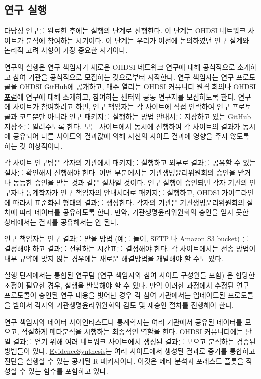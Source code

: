 \documentclass[11pt]{book}
\theoremstyle{definition}
\theoremstyle{definition}
\theoremstyle{definition}
\theoremstyle{remark}
\begin{document}
\subsection{연구 실행}\label{--1}

타당성 연구를 완료한 후에는 실행의 단계로 진행한다. 이 단계는 OHDSI
네트워크 사이트가 분석에 참여하는 시기이다. 이 단계는 우리가 이전에
논의하였던 연구 설계와 논리적 고려 사항이 가장 중요한 시기이다.

연구의 실행은 연구 책임자가 새로운 OHDSI 네트워크 연구에 대해 공식적으로
소개하고 참여 기관을 공식적으로 모집하는 것으로부터 시작한다. 연구
책임자는 연구 프로토콜을 OHDSI GitHub에 공개하고, 매주 열리는 OHDSI
커뮤니티 원격 회의나 \href{http://forums.ohdsi.org}{OHDSI 포럼}에 연구에
대해 소개하고, 참여하는 센터와 공동 연구자를 모집하도록 한다. 연구에
사이트가 참여하려고 하면, 연구 책임자는 각 사이트에 직접 연락하여 연구
프로토콜과 코드뿐만 아니라 연구 패키지를 실행하는 방법 안내서를 저장하고
있는 GitHub 저장소를 알려주도록 한다. 모든 사이트에서 동시에 진행하여 각
사이트의 결과가 동시에 공유되어 다른 사이트의 결과값에 의해 자신의
사이트 결과에 영향을 주지 않도록 하는 것 이상적이다.

각 사이트 연구팀은 각자의 기관에서 패키지를 실행하고 외부로 결과를
공유할 수 있는 절차를 확인해서 진행해야 한다. 어떤 부분에서는
기관생명윤리위원회의 승인을 받거나 동등한 승인을 받는 것과 같은 절차일
것이다. 연구 실행이 승인되면 각자 기관의 연구자나 통계학자가 연구
책임자의 안내서대로 패키지를 실행하고, OHDSI 가이드라인에 따라서
표준화된 형태의 결과를 생성한다. 각자의 기관은 기관생명윤리위원회의
절차에 따라 데이터를 공유하도록 한다. 만약, 기관생명윤리위원회의 승인을
얻지 못한 상태에서는 결과를 공유해서는 안 된다.

연구 책임자는 연구 결과를 받을 방법 (예를 들어, SFTP 나 Amazon S3
bucket) 를 결정해야 하고 결과를 전환하는 시간표를 결정해야 한다. 각
사이트에서는 전송 방법이 내부 규약에 맞지 않는 경우에는 새로운
해결방법을 개발해야 할 수도 있다.

실행 단계에서는 통합된 연구팀 (연구 책임자와 참여 사이트 구성원들 포함)
은 합당한 조정이 필요한 경우, 실행을 반복해야 할 수 있다. 만약 이러한
과정에서 수정된 연구 프로토콜이 승인된 연구 내용을 벗어난 경우 각 참여
기관에서는 업데이트된 프로토콜을 받아서 각자의 기관생명윤리위원회의 검토
및 재승인 절차를 진행해야 한다.

연구 책임자와 데이터 사이언티스트나 통계학자는 여러 기관에서 공유된
데이터를 모으고, 적절하게 메타분석을 시행하는 최종적인 역할을 한다.
OHDSI 커뮤니티에는 단일 결과를 얻기 위해 여러 네트워크 사이트에서 생성된
결과를 모으고 분석하는 검증된 방법들이 있다.
\href{https://github.com/OHDSI/EvidenceSynthesis}{EvidenceSynthesis}는
여러 사이트에서 생성된 결과로 증거를 통합하고 진단을 실행할 수 있는
공개된 R 패키지이다. 이것은 메타 분석과 포레스트 플롯을 작성할 수 있는
함수를 포함하고 있다.
\end{document}
